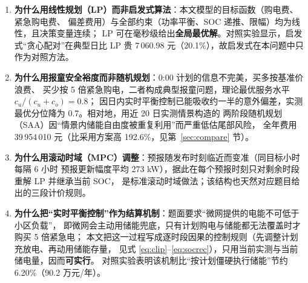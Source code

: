 \begin{enumerate}[label=(\arabic*), leftmargin=2.2em, itemsep=2pt]
\item \textbf{为什么用线性规划（LP\nobreak）而非启发式算法}\nobreak：本文模型的目标函数（购电费\nobreak、紧急购电费\nobreak、
偏差费用\nobreak）与全部约束（功率平衡\nobreak、SOC 递推\nobreak、限幅\nobreak）均为线性\nobreak，且决策变量连续\nobreak；
LP 可在毫秒级给出\textbf{全局最优解}\nobreak。对照实验显示\nobreak，启发式“贪心配对\nobreak”在典型日比 LP 贵
7\,060.98 元（20.1\%\nobreak）\nobreak，故启发式在本问题中只作为对照方法\nobreak。
\item \textbf{为什么用报童安全裕度而非随机规划}\nobreak：0:00 计划的信息不完美\nobreak，买多按基准价浪费\nobreak、
买少按 5 倍紧急购电\nobreak，二者构成典型报童问题\nobreak，理论最优服务水平 $c_u/(c_u+c_o)=0.8$\nobreak；
因日内实时平衡控制已能吸收约一半的意外偏差\nobreak，实测最优分位降为 0.7\nobreak。相对地\nobreak，用近 20 日实测情景构造的
两阶段随机规划（SAA\nobreak）因“情景内储能自由度被重复利用\nobreak”而严重低估尾部风险\nobreak，
全年费用 39\,954\,010 元（比采用方案高 192.6\%\nobreak，见第~\ref{sec:compare} 节\nobreak）\nobreak。
\item \textbf{为什么用滚动时域（MPC\nobreak）调整}\cite{mpc,cn102184475}\nobreak：预报随发布时刻临近而变准（同目标小时每隔 6 小时
预报更新幅度平均 273 kW\nobreak）\nobreak，据此在每个预报时刻只对剩余时段重解 LP 并继承当前 SOC\nobreak，
是标准滚动时域做法\nobreak；该结构也天然对应题目给出的三段计价规则\nobreak。
\item \textbf{为什么把“实时平衡控制\nobreak”作为结算机制}\nobreak：题面要求“微网提供的电能不可低于小区负载\nobreak”\nobreak，
即微网会主动用储能兜底\nobreak，只有计划购电与储能都无法覆盖时才购买 5 倍紧急电\nobreak；
本文把这一过程写成逐时段因果的控制规则（先调整计划充放电\nobreak、再动用储能存量\nobreak，
见式 \eqref{eq:clip}--\eqref{eq:socrec}\nobreak）\nobreak，只用当前实测与当前储电量\nobreak，因而\textbf{可实行}\nobreak。
对照实验表明该机制比“按计划僵硬执行储能\nobreak”节约 6.20\%（90.2 万元/年\nobreak）\nobreak。
\end{enumerate}
